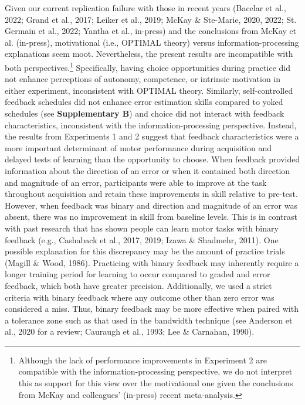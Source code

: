 \documentclass[
  man, donotrepeattitle,floatsintext]{apa7}
\begin{document}
Given our current replication failure with those in recent years (Bacelar et al., 2022; Grand et al., 2017; Leiker et al., 2019; McKay \& Ste-Marie, 2020, 2022; St. Germain et al., 2022; Yantha et al., in-press) and the conclusions from McKay et al. (in-press), motivational (i.e., OPTIMAL theory) versus information-processing explanations seem moot. Nevertheless, the present results are incompatible with both perspectives.\footnote{Although the lack of performance improvements in Experiment 2 are compatible with the information-processing perspective, we do not interpret this as support for this view over the motivational one given the conclusions from McKay and colleagues' (in-press) recent meta-analysis.} Specifically, having choice opportunities during practice did not enhance perceptions of autonomy, competence, or intrinsic motivation in either experiment, inconsistent with OPTIMAL theory. Similarly, self-controlled feedback schedules did not enhance error estimation skills compared to yoked schedules (see \textbf{Supplementary B}) and choice did not interact with feedback characteristics, inconsistent with the information-processing perspective. Instead, the results from Experiments 1 and 2 suggest that feedback characteristics were a more important determinant of motor performance during acquisition and delayed tests of learning than the opportunity to choose. When feedback provided information about the direction of an error or when it contained both direction and magnitude of an error, participants were able to improve at the task throughout acquisition and retain these improvements in skill relative to pre-test. However, when feedback was binary and direction and magnitude of an error was absent, there was no improvement in skill from baseline levels. This is in contrast with past research that has shown people can learn motor tasks with binary feedback (e.g., Cashaback et al., 2017, 2019; Izawa \& Shadmehr, 2011). One possible explanation for this discrepancy may be the amount of practice trials (Magill \& Wood, 1986). Practicing with binary feedback may inherently require a longer training period for learning to occur compared to graded and error feedback, which both have greater precision. Additionally, we used a strict criteria with binary feedback where any outcome other than zero error was considered a miss. Thus, binary feedback may be more effective when paired with a tolerance zone such as that used in the bandwidth technique (see Anderson et al., 2020 for a review; Cauraugh et al., 1993; Lee \& Carnahan, 1990).
\end{document}
